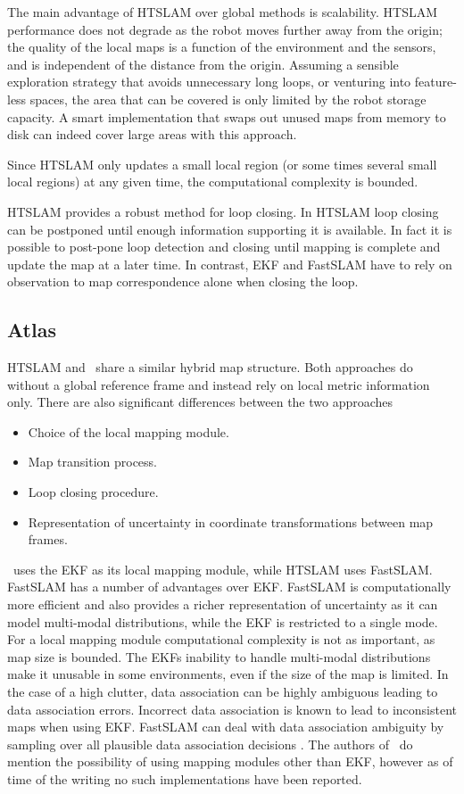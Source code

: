The main advantage of HTSLAM over global methods is scalability. HTSLAM
performance does not degrade as the robot moves further away from the
origin; the quality of the local maps is a function of the environment
and the sensors, and is independent of the distance from the
origin. Assuming a sensible exploration strategy that avoids unnecessary
long loops, or venturing into feature-less spaces, the area that can be
covered is only limited by the robot storage capacity. A smart
implementation that swaps out unused maps from memory to disk can indeed
cover large areas with this approach.

Since HTSLAM only updates a small local region (or some times
several small local regions) at any given time, the computational
complexity is bounded.

HTSLAM provides a robust method for loop closing. In HTSLAM loop
closing can be postponed until enough information supporting it is
available. In fact it is possible to post-pone loop detection and
closing until mapping is complete and update the map at a later time. In
contrast, EKF and FastSLAM have to rely on observation to map
correspondence alone when closing the loop.


\subsection{Atlas}

HTSLAM and \Atlas\ share a similar hybrid map structure. Both approaches
do without a global reference frame and instead rely on local metric
information only. There are also significant differences between the
two approaches

\begin{itemize}
\item Choice of the local mapping module.
\item Map transition process.
\item Loop closing procedure.
\item Representation of uncertainty in coordinate transformations
  between map frames.
\end{itemize}

\Atlas\ uses the EKF as its local mapping module, while HTSLAM uses
FastSLAM. FastSLAM has a number of advantages over EKF. FastSLAM is
computationally more efficient and also provides a richer representation
of uncertainty as it can model multi-modal distributions, while the EKF
is restricted to a single mode. For a local mapping module computational
complexity is not as important, as map size is bounded. The EKFs
inability to handle multi-modal distributions make it unusable in some
environments, even if the size of the map is limited. In the case of a
high clutter, data association can be highly ambiguous leading to data
association errors. Incorrect data association is known to lead to
inconsistent maps when using EKF. FastSLAM can deal with data
association ambiguity by sampling over all plausible data association
decisions \cite{fastslam,Montemerlo2003,nieto2003}. The authors of
\Atlas\ do mention the possibility of using mapping modules other than
EKF, however as of time of the writing no such implementations have been
reported.

